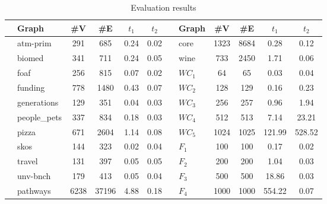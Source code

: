 {\setlength{\tabcolsep}{0.4em}
\begin{table}[ht]
\centering
\caption{Evaluation results}
\label{tbl:tableRDF}
\begin{tabular}{| c | p{1.6cm} | c | c | c | c || c | p{0.8cm} | c | c | c | c |}
    \hline
      &  Graph              & \#V & \#E  & $t_1$  & $t_2$ &  & Graph & \#V & \#E     & $t_1$    & $t_2$ \\
       \hline
       \hline
    \parbox[t]{2mm}{}
      & \small{atm-prim}                    & 291 & 685     & 0.24   & 0.02 & 
     \parbox[t]{2mm}{} & \small{core}                        & 1323 & 8684   & 0.28  &  0.12   \\
      & \small{biomed}                      & 341 & 711     & 0.24  & 0.05 & & \small{wine}                        & 733 & 2450    & 1.71  & 0.06      \\
      & \small{foaf}                        & 256 & 815     & 0.07  & 0.02 & 
      \parbox[t]{2mm}{} & $WC_1$& 64 & 65 & 0.03 & 0.04      \\
      & \small{funding}                     & 778 & 1480    & 0.43  & 0.07 & & $WC_2$ & 128 & 129 & 0.16 & 0.23      \\
      & \small{generations}                 & 129 & 351     & 0.04  & 0.03 & & $WC_3$ & 256 & 257 & 0.96 & 1.94    \\
      & \small{people\_pets}                & 337 & 834     & 0.18  & 0.03 & & $WC_4$ & 512 & 513 & 7.14 & 23.21      \\
      & \small{pizza}                       & 671 & 2604    & 1.14  & 0.08 & & $WC_5$ & 1024& 1025&  121.99 & 528.52      \\ 
      & \small{skos}                        & 144 & 323     & 0.02  & 0.04 & 
      \parbox[t]{2mm}{} & $F_1$ & 100 & 100 & 0.17 &  0.02     \\
      & \small{travel}                      & 131 & 397     & 0.05  & 0.05 & & $F_2$ & 200 & 200 & 1.04 & 0.03        \\
      & \small{unv-bnch}                    & 179 & 413     & 0.05  & 0.04 & & $F_3$ & 500 & 500 & 18.86  & 0.03   \\
      & \small{pathways}                    & 6238 & 37196  & 4.88 &   0.18 & & $F_4$ & 1000 & 1000& 554.22 & 0.07       \\
      \hline
  \end{tabular}
\end{table}
}

